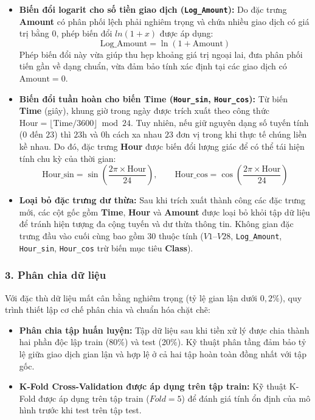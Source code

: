 \begin{itemize}
    \item \textbf{Biến đổi logarit cho số tiền giao dịch (\texttt{Log\_Amount}):} Do đặc trưng \textbf{Amount} có phân phối lệch phải nghiêm trọng và chứa nhiều giao dịch có giá trị bằng $0$, phép biến đổi $ln(1+x)$ được áp dụng:
    \begin{equation}
        \text{Log\_Amount} = \ln(1 + \text{Amount})
    \end{equation}
    Phép biến đổi này vừa giúp thu hẹp khoảng giá trị ngoại lai, đưa phân phối tiến gần về dạng chuẩn, vừa đảm bảo tính xác định tại các giao dịch có $\text{Amount} = 0$.

    \item \textbf{Biến đổi tuần hoàn cho biến Time (\texttt{Hour\_sin}, \texttt{Hour\_cos}):} Từ biến \textbf{Time} (giây), khung giờ trong ngày được trích xuất theo công thức $\text{Hour} = \lfloor \text{Time} / 3600 \rfloor \bmod 24$. Tuy nhiên, nếu giữ nguyên dạng số tuyến tính ($0$ đến $23$) thì $23\text{h}$ và $0\text{h}$ cách xa nhau $23$ đơn vị trong khi thực tế chúng liền kề nhau. Do đó, đặc trưng \textbf{Hour} được biến đổi lượng giác để có thể tái hiện tính chu kỳ của thời gian:
    \begin{equation}
        \text{Hour\_sin} = \sin\left(\frac{2\pi \times \text{Hour}}{24}\right), \qquad \text{Hour\_cos} = \cos\left(\frac{2\pi \times \text{Hour}}{24}\right)
    \end{equation}

    \item \textbf{Loại bỏ đặc trưng dư thừa:} Sau khi trích xuất thành công các đặc trưng mới, các cột gốc gồm \textbf{Time}, \textbf{Hour} và \textbf{Amount} được loại bỏ khỏi tập dữ liệu để tránh hiện tượng đa cộng tuyến và dư thừa thông tin. Không gian đặc trưng đầu vào cuối cùng bao gồm $30$ thuộc tính ($V1$--$V28$, \texttt{Log\_Amount}, \texttt{Hour\_sin}, \texttt{Hour\_cos} trừ biến mục tiêu \textbf{Class}).
\end{itemize}

\subsubsection*{3. Phân chia dữ liệu}
Với đặc thù dữ liệu mất cân bằng nghiêm trọng (tỷ lệ gian lận dưới $0,2\%$), quy trình thiết lập cơ chế phân chia và chuẩn hóa chặt chẽ:
\begin{itemize}
    \item \textbf{Phân chia tập huấn luyện:} Tập dữ liệu sau khi tiền xử lý được chia thành hai phần độc lập train (80\%) và test (20\%). Kỹ thuật phân tầng đảm bảo tỷ lệ giữa giao dịch gian lận và hợp lệ ở cả hai tập hoàn toàn đồng nhất với tập gốc.
    \item \textbf{ K-Fold Cross-Validation được áp dụng trên tập train:} Kỹ thuật K-Fold được áp dụng trên tập train ($Fold = 5$) để đánh giá tính ổn định của mô hình trước khi test trên tập test. 
\end{itemize}

